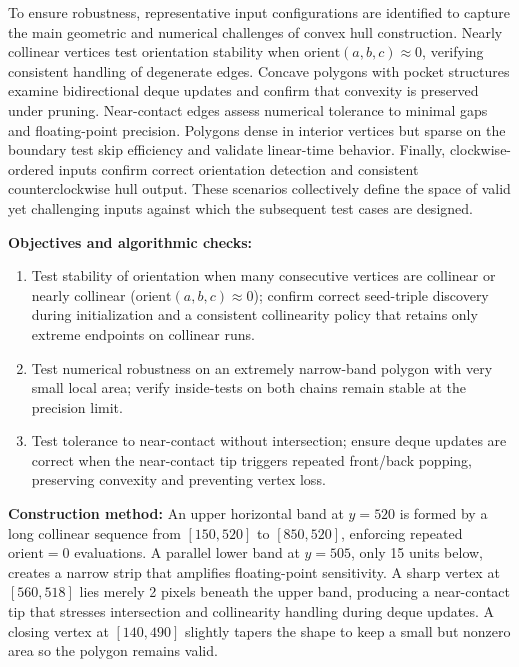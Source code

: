 \documentclass{article}
\begin{document}


To ensure robustness, representative input configurations are identified to capture the main geometric and numerical challenges of convex hull construction.  
Nearly collinear vertices test orientation stability when \(\text{orient}(a,b,c)\!\approx\!0\), verifying consistent handling of degenerate edges.  
Concave polygons with pocket structures examine bidirectional deque updates and confirm that convexity is preserved under pruning.  
Near-contact edges assess numerical tolerance to minimal gaps and floating-point precision.  
Polygons dense in interior vertices but sparse on the boundary test skip efficiency and validate linear-time behavior.  
Finally, clockwise-ordered inputs confirm correct orientation detection and consistent counterclockwise hull output.  
These scenarios collectively define the space of valid yet challenging inputs against which the subsequent test cases are designed.


\textbf{Objectives and algorithmic checks:}
\begin{enumerate}
    \item Test stability of orientation when many consecutive vertices are collinear or nearly collinear ($\text{orient}(a,b,c)\!\approx\!0$); confirm correct seed-triple discovery during initialization and a consistent collinearity policy that retains only extreme endpoints on collinear runs.
    \item Test numerical robustness on an extremely narrow-band polygon with very small local area; verify inside-tests on both chains remain stable at the precision limit.
    \item Test tolerance to near-contact without intersection; ensure deque updates are correct when the near-contact tip triggers repeated front/back popping, preserving convexity and preventing vertex loss.
\end{enumerate}

\textbf{Construction method:}
An upper horizontal band at $y=520$ is formed by a long collinear sequence from $[150,520]$ to $[850,520]$, enforcing repeated $\text{orient}=0$ evaluations. A parallel lower band at $y=505$, only 15 units below, creates a narrow strip that amplifies floating-point sensitivity. A sharp vertex at $[560,518]$ lies merely 2 pixels beneath the upper band, producing a near-contact tip that stresses intersection and collinearity handling during deque updates. A closing vertex at $[140,490]$ slightly tapers the shape to keep a small but nonzero area so the polygon remains valid.
\end{document}
